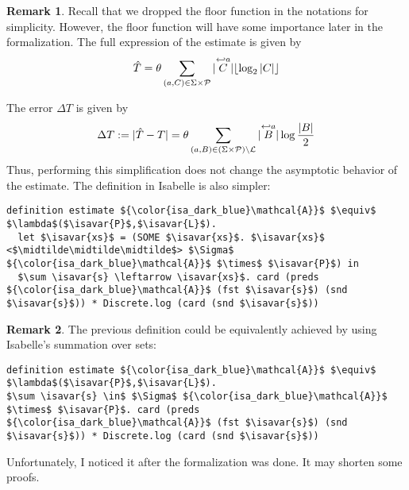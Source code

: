 \documentclass[12pt, a4 paper]{article}
\newcommand{\midtilde}{\raisebox{0.5ex}{\texttildelow}}
\newcommand{\isavar}[1]{{\color{isa_dark_green}\text{#1}}}
\theoremstyle{definition}
\newtheorem{remark}{Remark}
\begin{document}
\begin{remark}
Recall that we dropped the floor function in the notations for simplicity.
However, the floor function will have some importance later in the formalization.
The full expression of the estimate is given by
\begin{equation*}
    \hat{T} = \theta \sum_{(a, C) \in \Sigma\times \mathcal{P}} | \overset{\hookleftarrow {a}}{C} | \lfloor \log_2 | C | \rfloor
\end{equation*}
\end{remark}

\noindent
The error $\Delta T$ is given by
\begin{equation}
    \Delta T := |\hat{T} - T| = \theta \sum_{(a, B) \in (\Sigma\times \mathcal{P})\setminus \mathcal{L}} | \overset{\hookleftarrow {a}}{B} | \log \frac{| B |}{2}
\end{equation}
Thus, performing this simplification does not change the asymptotic behavior of the estimate.
The definition in Isabelle is also simpler:
\begin{lstlisting}[language=Isabelle]
definition estimate ${\color{isa_dark_blue}\mathcal{A}}$ $\equiv$ $\lambda$($\isavar{P}$,$\isavar{L}$).
  let $\isavar{xs}$ = (SOME $\isavar{xs}$. $\isavar{xs}$ <$\midtilde\midtilde\midtilde$> $\Sigma$ ${\color{isa_dark_blue}\mathcal{A}}$ $\times$ $\isavar{P}$) in
  $\sum \isavar{s} \leftarrow \isavar{xs}$. card (preds ${\color{isa_dark_blue}\mathcal{A}}$ (fst $\isavar{s}$) (snd $\isavar{s}$)) * Discrete.log (card (snd $\isavar{s}$))
\end{lstlisting}

\begin{remark}
The previous definition could be equivalently achieved by using Isabelle's summation over sets:
\begin{lstlisting}[language=Isabelle]
definition estimate ${\color{isa_dark_blue}\mathcal{A}}$ $\equiv$ $\lambda$($\isavar{P}$,$\isavar{L}$).
$\sum \isavar{s} \in$ $\Sigma$ ${\color{isa_dark_blue}\mathcal{A}}$ $\times$ $\isavar{P}$. card (preds ${\color{isa_dark_blue}\mathcal{A}}$ (fst $\isavar{s}$) (snd $\isavar{s}$)) * Discrete.log (card (snd $\isavar{s}$))
\end{lstlisting}
Unfortunately, I noticed it after the formalization was done. It may shorten some proofs.
\end{remark}
\end{document}
